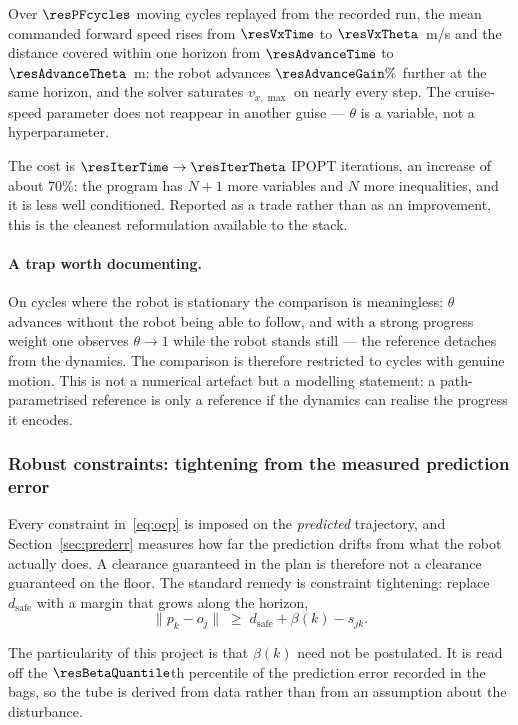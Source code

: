 \documentclass[11pt,a4paper]{article}
\newcommand{\dsafe}{d_{\mathrm{safe}}}
\begin{document}

Over $\resPFcycles$ moving cycles replayed from the recorded run, the mean commanded forward speed rises from
$\resVxTime$ to $\resVxTheta$~m/s and the distance covered within one horizon from $\resAdvanceTime$ to
$\resAdvanceTheta$~m: the robot advances $\resAdvanceGain\%$ further at the same horizon, and the solver
saturates $v_{x,\max}$ on nearly every step. The cruise-speed parameter does not reappear in another guise
--- $\theta$ is a variable, not a hyperparameter.

The cost is $\resIterTime\to\resIterTheta$ IPOPT iterations, an increase of about $70\%$: the program has
$N+1$ more variables and $N$ more inequalities, and it is less well conditioned. Reported as a trade rather
than as an improvement, this is the cleanest reformulation available to the stack.

\paragraph{A trap worth documenting.} On cycles where the robot is stationary the comparison is meaningless:
$\theta$ advances without the robot being able to follow, and with a strong progress weight one observes
$\theta\to1$ while the robot stands still --- the reference detaches from the dynamics. The comparison is
therefore restricted to cycles with genuine motion. This is not a numerical artefact but a modelling
statement: a path-parametrised reference is only a reference if the dynamics can realise the progress it
encodes.

\subsubsection{Robust constraints: tightening from the measured prediction error}
\label{sec:robust}

Every constraint in~\eqref{eq:ocp} is imposed on the \emph{predicted} trajectory, and
Section~\ref{sec:prederr} measures how far the prediction drifts from what the robot actually does. A
clearance guaranteed in the plan is therefore not a clearance guaranteed on the floor. The standard remedy is
constraint tightening: replace $\dsafe$ with a margin that grows along the horizon,
\begin{equation}
  \big\|p_k-o_j\big\| \;\ge\; \dsafe+\beta(k)-s_{jk}.
  \label{eq:tighten}
\end{equation}

The particularity of this project is that $\beta(k)$ need not be postulated. It is read off the
$\resBetaQuantile$th percentile of the prediction error recorded in the bags, so the tube is derived from
data rather than from an assumption about the disturbance.
\end{document}
